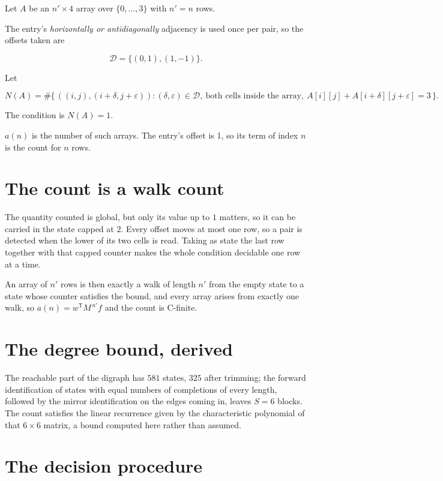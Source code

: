 \documentclass[11pt]{article}
\theoremstyle{definition}
\begin{document}
Let $A$ be an $n' \times 4$ array over $\{0,\dots,3\}$ with $n' = n$ rows.

The entry's {\itshape horizontally or antidiagonally} adjacency is used once per pair, so the offsets taken are

\[\mathcal{D} = \{(0,1), (1,-1)\}.\]

Let

\[N(A) = \#\bigl\{\,((i,j),(i{+}\delta,j{+}\varepsilon)) : (\delta,\varepsilon) \in \mathcal{D},\ \text{both cells inside the array},\ A[i][j] + A[i{+}\delta][j{+}\varepsilon] = 3\,\bigr\}.\]

The condition is $N(A) = 1$.

$a(n)$ is the number of such arrays. The entry's offset is 1, so its term of index $n$ is the count for $n$ rows.

\section{The count is a walk count}

The quantity counted is global, but only its value up to $1$ matters, so it can be carried in the state capped at $2$. Every offset moves at most one row, so a pair is detected when the lower of its two cells is read. Taking as state the last row together with that capped counter makes the whole condition decidable one row at a time.

An array of $n'$ rows is then exactly a walk of length $n'$ from the empty state to a state whose counter satisfies the bound, and every array arises from exactly one walk, so $a(n) = w^{\mathsf T}M^{\,n'}f$ and the count is C-finite.

\section{The degree bound, derived}

The reachable part of the digraph has $581$ states, $325$ after trimming; the forward identification of states with equal numbers of completions of every length, followed by the mirror identification on the edges coming in, leaves $S = 6$ blocks. The count satisfies the linear recurrence given by the characteristic polynomial of that $6\times6$ matrix, a bound computed here rather than assumed.

\section{The decision procedure}
\end{document}
